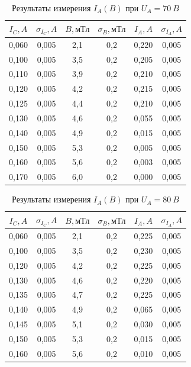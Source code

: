\documentclass[a4paper, 12pt]{article}
\begin{document}
\begin{table}[h!]
\begin{center}
\begin{tabular}{|c|c|c|c|c|c|}
\hline
$I_C, A$ & $\sigma_{I_C}, A$ & $B, мТл$ & $\sigma_{B}, мТл$ & $I_A, A$ & $\sigma_{I_A}, A$ \\ \hline
0,060 & 0,005  & 2,1    & 0,2     & 0,220 & 0,005  \\ \hline
0,100 & 0,005  & 3,5    & 0,2     & 0,205 & 0,005  \\ \hline
0,110 & 0,005  & 3,9    & 0,2     & 0,210 & 0,005  \\ \hline
0,120 & 0,005  & 4,2    & 0,2     & 0,215 & 0,005  \\ \hline
0,125 & 0,005  & 4,4    & 0,2     & 0,210 & 0,005  \\ \hline
0,130 & 0,005  & 4,6    & 0,2     & 0,055 & 0,005  \\ \hline
0,140 & 0,005  & 4,9    & 0,2     & 0,015 & 0,005  \\ \hline
0,150 & 0,005  & 5,3    & 0,2     & 0,005 & 0,005  \\ \hline
0,160 & 0,005  & 5,6    & 0,2     & 0,003 & 0,005  \\ \hline
0,170 & 0,005  & 6,0    & 0,2     & 0,000 & 0,005  \\ \hline
\end{tabular}
\end{center}
\caption{Результаты измерения $I_A(B)$ при $U_A = 70~B$}
\label{tab5}
\end{table}

\begin{table}[h!]
\begin{center}
\begin{tabular}{|c|c|c|c|c|c|}
\hline
$I_C, A$ & $\sigma_{I_C}, A$ & $B, мТл$ & $\sigma_{B}, мТл$ & $I_A, A$ & $\sigma_{I_A}, A$ \\ \hline
0,060 & 0,005  & 2,1    & 0,2     & 0,225 & 0,005  \\ \hline
0,100 & 0,005  & 3,5    & 0,2     & 0,230 & 0,005  \\ \hline
0,120 & 0,005  & 4,2    & 0,2     & 0,225 & 0,005  \\ \hline
0,130 & 0,005  & 4,6    & 0,2     & 0,220 & 0,005  \\ \hline
0,135 & 0,005  & 4,7    & 0,2     & 0,225 & 0,005  \\ \hline
0,140 & 0,005  & 4,9    & 0,2     & 0,065 & 0,005  \\ \hline
0,145 & 0,005  & 5,1    & 0,2     & 0,030 & 0,005  \\ \hline
0,150 & 0,005  & 5,3    & 0,2     & 0,015 & 0,005  \\ \hline
0,160 & 0,005  & 5,6    & 0,2     & 0,010 & 0,005  \\ \hline
\end{tabular}
\end{center}
\caption{Результаты измерения $I_A(B)$ при $U_A = 80~B$}
\label{tab6}
\end{table}
\end{document}
